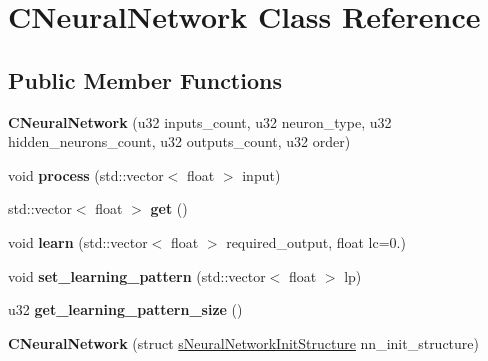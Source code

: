 \hypertarget{classCNeuralNetwork}{\section{C\-Neural\-Network Class Reference}
\label{classCNeuralNetwork}
}
\subsection*{Public Member Functions}
\begin{DoxyCompactItemize}
\item 
\hypertarget{classCNeuralNetwork_ab5cec0fcb144aea91397cbac4953ec07}{{\bfseries C\-Neural\-Network} (u32 inputs\-\_\-count, u32 neuron\-\_\-type, u32 hidden\-\_\-neurons\-\_\-count, u32 outputs\-\_\-count, u32 order)}\label{classCNeuralNetwork_ab5cec0fcb144aea91397cbac4953ec07}

\item 
\hypertarget{classCNeuralNetwork_a5296b2830588ff8ca2570f18750536b7}{void {\bfseries process} (std\-::vector$<$ float $>$ input)}\label{classCNeuralNetwork_a5296b2830588ff8ca2570f18750536b7}

\item 
\hypertarget{classCNeuralNetwork_a3ec86f65e3f47401daba3f8c9e051a56}{std\-::vector$<$ float $>$ {\bfseries get} ()}\label{classCNeuralNetwork_a3ec86f65e3f47401daba3f8c9e051a56}

\item 
\hypertarget{classCNeuralNetwork_af58451c97d8355772338686dc83ba120}{void {\bfseries learn} (std\-::vector$<$ float $>$ required\-\_\-output, float lc=0.)}\label{classCNeuralNetwork_af58451c97d8355772338686dc83ba120}

\item 
\hypertarget{classCNeuralNetwork_aee677fd3aad98d88a079d79ca282e788}{void {\bfseries set\-\_\-learning\-\_\-pattern} (std\-::vector$<$ float $>$ lp)}\label{classCNeuralNetwork_aee677fd3aad98d88a079d79ca282e788}

\item 
\hypertarget{classCNeuralNetwork_a6715353c75a8e3ecc82e2055b4d1246e}{u32 {\bfseries get\-\_\-learning\-\_\-pattern\-\_\-size} ()}\label{classCNeuralNetwork_a6715353c75a8e3ecc82e2055b4d1246e}

\item 
\hypertarget{classCNeuralNetwork_af2f5f3147ed5c69c3b648347817dc8d1}{{\bfseries C\-Neural\-Network} (struct \hyperlink{structsNeuralNetworkInitStructure}{s\-Neural\-Network\-Init\-Structure} nn\-\_\-init\-\_\-structure)}\label{classCNeuralNetwork_af2f5f3147ed5c69c3b648347817dc8d1}


\end{DoxyCompactItemize}
